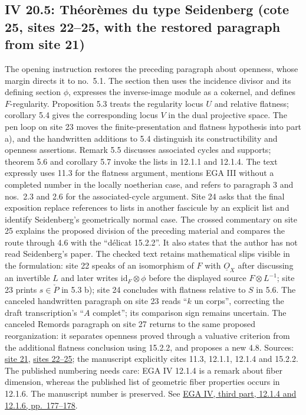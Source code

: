 \subsection*{IV 20.5: Théorèmes du type Seidenberg (cote 25, sites 22--25, with the restored paragraph from site 21)}
The opening instruction restores the preceding paragraph about openness, whose margin directs it to no.\ 5.1. The section then uses the incidence divisor and its defining section $\phi$, expresses the inverse-image module as a cokernel, and defines $F$-regularity. Proposition 5.3 treats the regularity locus $U$ and relative flatness; corollary 5.4 gives the corresponding locus $V$ in the dual projective space. The pen loop on site 23 moves the finite-presentation and flatness hypothesis into part a), and the handwritten additions to 5.4 distinguish its constructibility and openness assertions. Remark 5.5 discusses associated cycles and supports; theorem 5.6 and corollary 5.7 invoke the lists in 12.1.1 and 12.1.4. The text expressly uses 11.3 for the flatness argument, mentions EGA III without a completed number in the locally noetherian case, and refers to paragraph 3 and nos.\ 2.3 and 2.6 for the associated-cycle argument. Site 24 asks that the final exposition replace references to lists in another fascicule by an explicit list and identify Seidenberg's geometrically normal case. The crossed commentary on site 25 explains the proposed division of the preceding material and compares the route through 4.6 with the ``délicat 15.2.2''. It also states that the author has not read Seidenberg's paper. The checked text retains mathematical slips visible in the formulation: site 22 speaks of an isomorphism of $F$ with $\underline{O}_X$ after discussing an invertible $L$ and later writes $\mathrm{id}_F\otimes\phi$ before the displayed source $F\otimes L^{-1}$; site 23 prints $s\in\check P$ in 5.3 b); site 24 concludes with flatness relative to $S$ in 5.6. The canceled handwritten paragraph on site 23 reads ``$k$ un corps'', correcting the draft transcription's ``$A$ complet''; its comparison sign remains uncertain. The canceled Remords paragraph on site 27 returns to the same proposed reorganization: it separates openness proved through a valuative criterion from the additional flatness conclusion using 15.2.2, and proposes a new 4.8. Sources: \href{https://grothendieck.umontpellier.fr/web/viewer.html?file=../25.pdf\#page=22}{site 21}, \href{https://grothendieck.umontpellier.fr/web/viewer.html?file=../25.pdf\#page=23}{sites 22--25}; the manuscript explicitly cites 11.3, 12.1.1, 12.1.4 and 15.2.2. The published numbering needs care: EGA IV 12.1.4 is a remark about fiber dimension, whereas the published list of geometric fiber properties occurs in 12.1.6. The manuscript number is preserved. See \href{https://www.numdam.org/articles/10.1007/BF02684343/}{EGA IV, third part, 12.1.4 and 12.1.6, pp.\ 177--178}.
